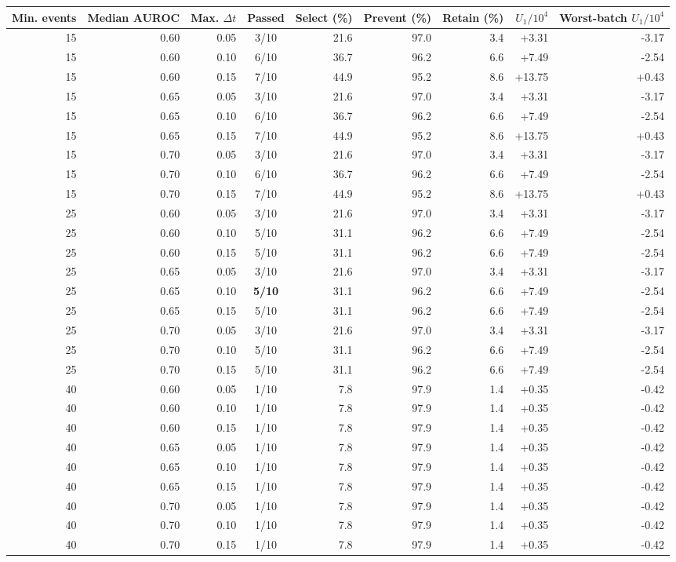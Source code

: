 \begin{tabular}{rrrcrrrrr}
\toprule
Min. events & Median AUROC & Max. $\Delta t$ & Passed & Select (\%) & Prevent (\%) & Retain (\%) & $U_1/10^4$ & Worst-batch $U_1/10^4$ \\
\midrule
15 & 0.60 & 0.05 & 3/10 & 21.6 & 97.0 & 3.4 & +3.31 & -3.17 \\
15 & 0.60 & 0.10 & 6/10 & 36.7 & 96.2 & 6.6 & +7.49 & -2.54 \\
15 & 0.60 & 0.15 & 7/10 & 44.9 & 95.2 & 8.6 & +13.75 & +0.43 \\
15 & 0.65 & 0.05 & 3/10 & 21.6 & 97.0 & 3.4 & +3.31 & -3.17 \\
15 & 0.65 & 0.10 & 6/10 & 36.7 & 96.2 & 6.6 & +7.49 & -2.54 \\
15 & 0.65 & 0.15 & 7/10 & 44.9 & 95.2 & 8.6 & +13.75 & +0.43 \\
15 & 0.70 & 0.05 & 3/10 & 21.6 & 97.0 & 3.4 & +3.31 & -3.17 \\
15 & 0.70 & 0.10 & 6/10 & 36.7 & 96.2 & 6.6 & +7.49 & -2.54 \\
15 & 0.70 & 0.15 & 7/10 & 44.9 & 95.2 & 8.6 & +13.75 & +0.43 \\
25 & 0.60 & 0.05 & 3/10 & 21.6 & 97.0 & 3.4 & +3.31 & -3.17 \\
25 & 0.60 & 0.10 & 5/10 & 31.1 & 96.2 & 6.6 & +7.49 & -2.54 \\
25 & 0.60 & 0.15 & 5/10 & 31.1 & 96.2 & 6.6 & +7.49 & -2.54 \\
25 & 0.65 & 0.05 & 3/10 & 21.6 & 97.0 & 3.4 & +3.31 & -3.17 \\
25 & 0.65 & 0.10 & \textbf{5/10} & 31.1 & 96.2 & 6.6 & +7.49 & -2.54 \\
25 & 0.65 & 0.15 & 5/10 & 31.1 & 96.2 & 6.6 & +7.49 & -2.54 \\
25 & 0.70 & 0.05 & 3/10 & 21.6 & 97.0 & 3.4 & +3.31 & -3.17 \\
25 & 0.70 & 0.10 & 5/10 & 31.1 & 96.2 & 6.6 & +7.49 & -2.54 \\
25 & 0.70 & 0.15 & 5/10 & 31.1 & 96.2 & 6.6 & +7.49 & -2.54 \\
40 & 0.60 & 0.05 & 1/10 & 7.8 & 97.9 & 1.4 & +0.35 & -0.42 \\
40 & 0.60 & 0.10 & 1/10 & 7.8 & 97.9 & 1.4 & +0.35 & -0.42 \\
40 & 0.60 & 0.15 & 1/10 & 7.8 & 97.9 & 1.4 & +0.35 & -0.42 \\
40 & 0.65 & 0.05 & 1/10 & 7.8 & 97.9 & 1.4 & +0.35 & -0.42 \\
40 & 0.65 & 0.10 & 1/10 & 7.8 & 97.9 & 1.4 & +0.35 & -0.42 \\
40 & 0.65 & 0.15 & 1/10 & 7.8 & 97.9 & 1.4 & +0.35 & -0.42 \\
40 & 0.70 & 0.05 & 1/10 & 7.8 & 97.9 & 1.4 & +0.35 & -0.42 \\
40 & 0.70 & 0.10 & 1/10 & 7.8 & 97.9 & 1.4 & +0.35 & -0.42 \\
40 & 0.70 & 0.15 & 1/10 & 7.8 & 97.9 & 1.4 & +0.35 & -0.42 \\
\bottomrule
\end{tabular}
